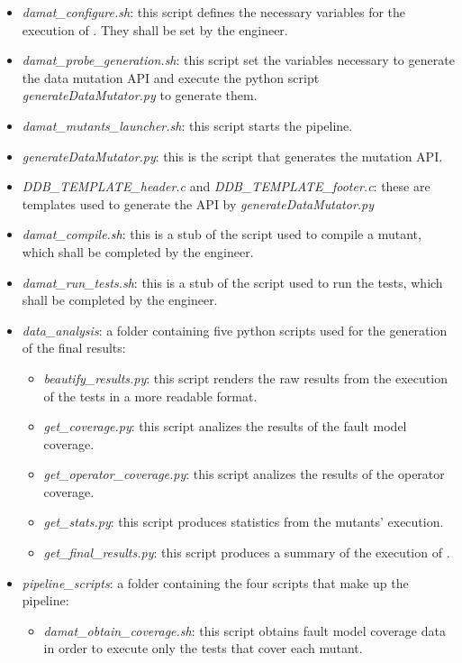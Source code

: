 \begin{itemize}
	\item \textit{damat\_configure.sh}: this script defines the necessary variables for the execution of \dama. They shall be set by the engineer.
	\item \textit{damat\_probe\_generation.sh}: this script set the variables necessary to generate the data mutation API and execute the python script \textit{generateDataMutator.py} to generate them.
	\item \textit{damat\_mutants\_launcher.sh}: this script starts the \dama pipeline.
	\item \textit{generateDataMutator.py}: this is the script that generates the \dama mutation API.
	\item \textit{DDB\_TEMPLATE\_header.c} and \textit{DDB\_TEMPLATE\_footer.c}: these are templates used to generate the \dama API by \textit{generateDataMutator.py}
	\item \textit{damat\_compile.sh}: this is a stub of the script used to compile a mutant, which shall be completed by the engineer.
	\item \textit{damat\_run\_tests.sh}: this is a stub of the script used to run the tests, which shall be completed by the engineer.
	\item \textit{data\_analysis}: a folder containing five python scripts used for the generation of the final results:
	\begin{itemize}
	  \item \textit{beautify\_results.py}: this script renders the raw results from the execution of the tests in a more readable format.
	  \item \textit{get\_coverage.py}: this script analizes the results of the fault model coverage.
	  \item \textit{get\_operator\_coverage.py}: this script analizes the results of the operator coverage.
	  \item \textit{get\_stats.py}: this script produces statistics from the mutants' execution.
		\item \textit{get\_final\_results.py}: this script produces a summary of the execution of \dama.
	\end{itemize}
	\item \textit{pipeline\_scripts}: a folder containing the four scripts that make up the \dama pipeline:
	\begin{itemize}
		\item \textit{damat\_obtain\_coverage.sh}: this script obtains fault model coverage data in order to execute only the tests that cover each mutant.

\end{itemize}
\end{itemize}
